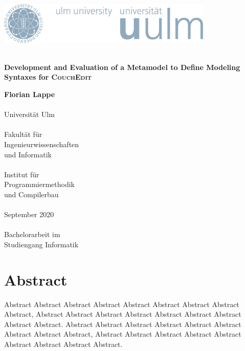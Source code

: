 \documentclass[
a4paper,
numbers=noenddot,      %
bibliography=totoc,              %
BCOR=15mm,               %
leqno					%
]{scrbook}
\newcommand{\fullname}{Florian Lappe}
\newcommand{\titel}{}
\newcommand{\untertitel}{Development and Evaluation of a Metamodel to Define Modeling Syntaxes for \textsc{CouchEdit}}
\newcommand{\abgabedatum}{September 2020}
\newcommand{\abschlussarbeit}{Bachelorarbeit}
\begin{document}
\frontmatter %


\begin{titlepage}
  \selectfont %
  \hfill\includegraphics[height=2.0cm]{images/logo_100_sRGB}\\[3.5cm] %
  \begin{flushright}
    \Huge \textbf{\titel}\\[0.2cm]
    \fontsize{19}{20}\selectfont \textbf{\untertitel}\\
  \end{flushright}

  \vfill\hfill
  \parbox[t]{4.6cm}{
  \singlespacing
  \large
  \textbf{\fullname}\\
  \\
  Universität Ulm\\
  \\
  Fakultät für\\
  Ingenieurwissenschaften\\
  und Informatik\\
  \\
  Institut für\\
  Programmiermethodik\\
  und Compilerbau\\
  \\
  \abgabedatum\\
  \\
  {\abschlussarbeit} im\\
  Studiengang Informatik
  }
\end{titlepage}
\restoregeometry


\clearpage
\thispagestyle{empty}
\chapter*{Abstract}


Abstract Abstract Abstract Abstract Abstract Abstract Abstract Abstract Abstract,
Abstract Abstract Abstract Abstract Abstract Abstract Abstract Abstract Abstract.
Abstract Abstract Abstract Abstract Abstract Abstract Abstract Abstract Abstract,
Abstract Abstract Abstract Abstract Abstract Abstract Abstract Abstract Abstract.
\end{document}
